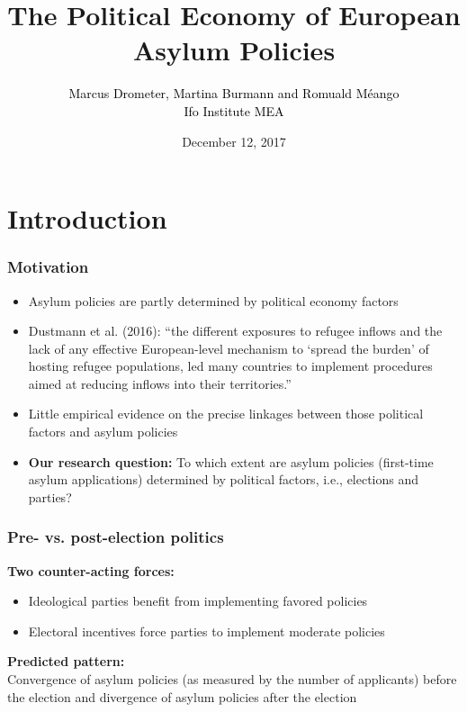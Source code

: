 \documentclass[compress, xcolor = {table,xcdraw}]{beamer}
\title {The Political Economy of European Asylum Policies}
\subtitle{\small\textcolor{black}{Marcus Drometer, Martina Burmann and Romuald M\'eango\\[1ex]
		\scriptsize{\hspace{10ex}Ifo Institute \hspace{29ex} MEA}}}
\institute{ifo Christmas Conference}
\date{December 12, 2017}
\begin{document}

\begin{frame}[plain]
\setlength{\leftmargin}{1cm}
\titlepage 
\end{frame}

\section{Introduction}

\begin{frame}
\frametitle{Motivation}
\begin{itemize}
	\item Asylum policies are partly determined by political economy
	factors
	
	\item Dustmann et al. (2016): ``the  different  exposures  to  refugee  inflows and  the  lack  of  any  effective  European-level  mechanism  to  `spread  the  burden'  of  hosting  refugee  populations,  led  many  countries  to  implement  procedures  aimed  at  reducing  inflows  into  their  territories.''
	
	\bigskip
	\item Little empirical evidence on the precise linkages between those political factors and asylum policies

	\bigskip
	\item \textbf{Our research question:} To which extent are asylum policies (first-time asylum applications) determined by political factors, i.e.,  elections and parties?
  
\end{itemize}
\end{frame}


\begin{frame} [t]
\frametitle{Pre- vs. post-election politics}
\textbf{Two counter-acting forces:}

\begin{itemize}
	\item Ideological parties benefit from implementing favored policies
	\item Electoral incentives force parties to implement moderate policies
\end{itemize}

\bigskip

\textbf{Predicted pattern:} \\
\smallskip
Convergence of asylum policies (as measured by the number of applicants) before the election and divergence of asylum policies after the election
\end{frame}
\end{document}
